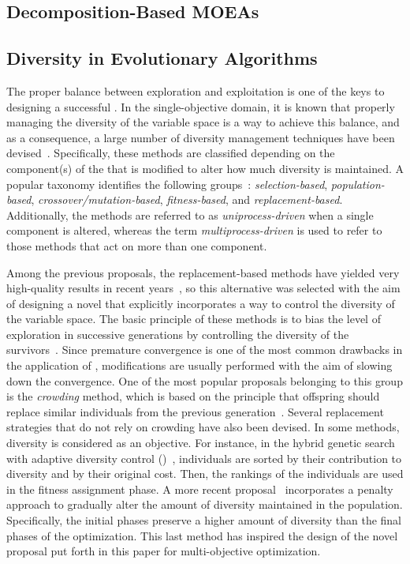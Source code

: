 \subsection{Decomposition-Based MOEAs}



\subsection{Diversity in Evolutionary Algorithms}

The proper balance between exploration and exploitation is one of the keys to designing a successful \EAS{}.
%
In the single-objective domain, it is known that properly managing the diversity of the variable space is a way to achieve this balance,
and as a consequence, a large number of diversity management techniques have been devised~\cite{Mohan:14}.
%
Specifically, these methods are classified depending on the component(s) of the \EA{} that is modified to alter how much diversity is maintained.
%
A popular taxonomy identifies the following groups~\cite{Joel:Crepinsek}: \textit{selection-based}, \textit{population-based}, 
\textit{crossover/mutation-based}, \textit{fitness-based}, and \textit{replacement-based}.
%
Additionally, the methods are referred to as \textit{uniprocess-driven} when a single component is altered, whereas the term
\textit{multiprocess-driven} is used to refer to those methods that act on more than one component.

Among the previous proposals, the replacement-based methods have yielded very high-quality results in recent years~\cite{Segura:17}, so
this alternative was selected with the aim of designing a novel \MOEA{} that explicitly incorporates a way to control the diversity 
of the variable space.
%
The basic principle of these methods is to bias the level of exploration in successive generations by 
controlling the diversity of the survivors~\cite{Segura:17}.
%
Since premature convergence is one of the most common drawbacks in the application of \EAS{}, 
modifications are usually performed with the aim of slowing down the convergence.
%
One of the most popular proposals belonging to this group is the \textit{crowding} method, which
is based on the principle that offspring should replace similar individuals from the previous generation~\cite{Mengshoel:14}.
%
Several replacement strategies that do not rely on crowding have also been devised.
%
In some methods, diversity is considered as an objective.
%
For instance, in the hybrid genetic search with adaptive diversity control (\HGSADC{})~\cite{Vidal:13}, individuals are sorted 
by their contribution to diversity and by their original cost.
%
Then, the rankings of the individuals are used in the fitness assignment phase.
%
A more recent proposal~\cite{Segura:17} incorporates a penalty approach to gradually alter the amount of diversity 
maintained in the population.
%
Specifically, the initial phases preserve a higher amount of diversity than the final phases of the optimization.
%
This last method has inspired the design of the novel proposal put forth in this paper for multi-objective optimization.
%

